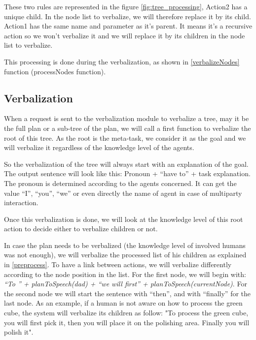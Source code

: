 \documentclass{llncs}
\begin{document}
These two rules are represented in the figure \ref{fig:tree_processing}, Action2 has a unique child. In the node list to verbalize, we will therefore replace it by its child. Action1 has the same name and parameter as it's parent. It means it's a recursive action so we won't verbalize it and we will replace it by its children in the node list to verbalize.

This processing is done during the verbalization, as shown in \ref{verbalizeNodes} function (processNodes function).


\subsection{Verbalization}

When a request is sent to the verbalization module to verbalize a tree, may it be the full plan or a sub-tree of the plan, we will call a first function to verbalize the root of this tree. As the root is the meta-task, we consider it as the goal and we will verbalize it regardless of the knowledge level of the agents.

So the verbalization of the tree will always start with an explanation of the goal.
The output sentence will look like this:
Pronoun + ``have to'' + task explanation.
The pronoun is determined according to the agents concerned. It can get the value ``I'', ``you'', ``we'' or even directly the name of agent in case of multiparty interaction.

Once this verbalization is done, we will look at the knowledge level of this root action to decide either to verbalize children or not.





In case the plan needs to be verbalized (the knowledge level of involved humans was not enough), we will verbalize the processed list of his children as explained in \ref{preprocess}.
To have a link between actions, we will verbalize differently according to the node position in the list.
For the first node, we will begin with: \textit{``To '' + planToSpeech(dad) + ``we will first'' + planToSpeech(currentNode)}. For the second node we will start the sentence with ``then'', and with ``finally'' for the last node.
As an example, if a human is not aware on how to process the green cube, the system will verbalize its children as follow:
"To process the green cube, you will first pick it, then you will place it on the polishing area. Finally you will polish it". 
\end{document}

